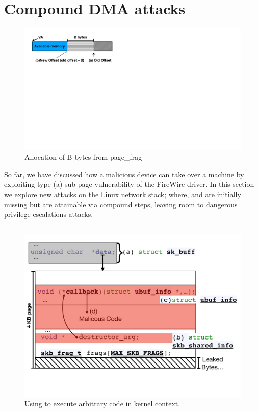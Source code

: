 \section{Compound DMA attacks}\label{sec:linux_net}
\begin{figure}
    \centering
    \includegraphics[width=1\linewidth]{figs/page_frag.pdf}
    \caption{Allocation of B bytes from page\_frag}
    \label{fig:page_frags}
\end{figure}

So far, we have discussed how a malicious device can take over a machine by exploiting type (a) sub page vulnerability of the FireWire driver. In this section we explore new attacks on the Linux network stack; where, \means{} and \oportunity{} 
are initially missing but are attainable via compound steps, leaving room to dangerous privilege escalations attacks.

\subsection{\shinfo}
\begin{figure}[t]
    \centering
    \includegraphics[width=\linewidth]{figs/ubuf.pdf}
    \caption{Using \shinfo{} to execute arbitrary code in kernel context.}
    \label{fig:sh_info}
\end{figure}

